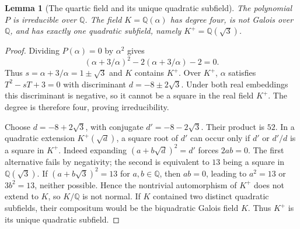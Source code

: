 \documentclass[11pt]{article}
\newtheorem{lemma}[lemma]{Lemma}
\theoremstyle{definition}
\theoremstyle{remark}
\newcommand{\Q}{\mathbb Q}
\begin{document}
\begin{lemma}[The quartic field and its unique quadratic subfield]
\label{lem:v6-K3-field}
The polynomial $P$ is irreducible over $\Q$. The field
$K=\Q(\alpha)$ has degree four, is not Galois over $\Q$, and has
exactly one quadratic subfield, namely $K^+=\Q(\sqrt3)$.
\end{lemma}
\begin{proof}
Dividing $P(\alpha)=0$ by $\alpha^2$ gives
\[
 (\alpha+3/\alpha)^2-2(\alpha+3/\alpha)-2=0.
\]
Thus $s=\alpha+3/\alpha=1\pm\sqrt3$ and $K$ contains $K^+$.
Over $K^+$, $\alpha$ satisfies $T^2-sT+3=0$ with discriminant
$d=-8\pm2\sqrt3$. Under both real embeddings this discriminant is
negative, so it cannot be a square in the real field $K^+$. The degree
is therefore four, proving irreducibility.

Choose $d=-8+2\sqrt3$, with conjugate $d'=-8-2\sqrt3$.
Their product is $52$. In a quadratic extension $K^+(\sqrt d)$, a
square root of $d'$ can occur only if $d'$ or $d'/d$ is a square in
$K^+$. Indeed expanding $(a+b\sqrt d)^2=d'$ forces $2ab=0$.
The first alternative fails by negativity; the second is equivalent to
$13$ being a square in $\Q(\sqrt3)$. If $(a+b\sqrt3)^2=13$ for
$a,b\in\Q$, then $ab=0$, leading to $a^2=13$ or $3b^2=13$, neither
possible. Hence the nontrivial automorphism of $K^+$ does not extend to
$K$, so $K/\Q$ is not normal. If $K$ contained two distinct quadratic
subfields, their compositum would be the biquadratic Galois field $K$.
Thus $K^+$ is its unique quadratic subfield.
\end{proof}
\end{document}
